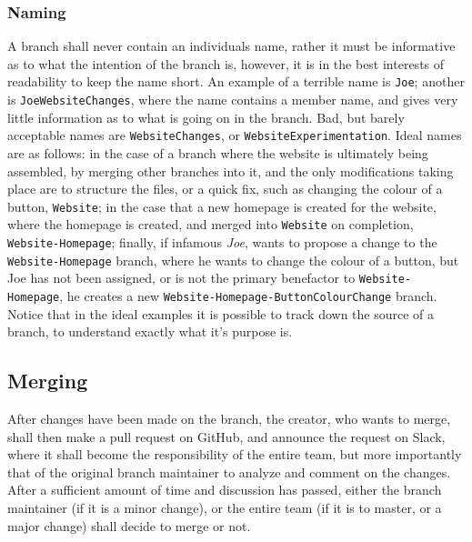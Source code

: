 \documentclass[12pt]{article}
\begin{document}
  \subsubsection{Naming}
  A branch shall never contain an individuals name, rather it must be informative as to what the intention of the branch is, however, it is in the best interests of readability to keep the name short. An example of a terrible name is \texttt{Joe}; another is \texttt{JoeWebsiteChanges}, where the name contains a member name, and gives very little information as to what is going on in the branch. Bad, but barely acceptable names are \texttt{WebsiteChanges}, or \texttt{WebsiteExperimentation}. Ideal names are as follows: in the case of a branch where the website is ultimately being assembled, by merging other branches into it, and the only modifications taking place are to structure the files, or a quick fix, such as changing the colour of a button, \texttt{Website}; in the case that a new homepage is created for the website, where the homepage is created, and merged into \texttt{Website} on completion, \texttt{Website-Homepage}; finally, if infamous \textit{Joe}, wants to propose a change to the \texttt{Website-Homepage} branch, where he wants to change the colour of a button, but Joe has not been assigned, or is not the primary benefactor to \texttt{Website-Homepage}, he creates a new \texttt{Website-Homepage-ButtonColourChange} branch. Notice that in the ideal examples it is possible to track down the source of a branch, to understand exactly what it's purpose is.
  
  \subsection{Merging}
  After changes have been made on the branch, the creator, who wants to merge, shall then make a pull request on GitHub, and announce the request on Slack, where it shall become the responsibility of the entire team, but more importantly that of the original branch maintainer to analyze and comment on the changes. After a sufficient amount of time and discussion has passed, either the branch maintainer (if it is a minor change), or the entire team (if it is to master, or a major change) shall decide to merge or not.
  
\end{document}

